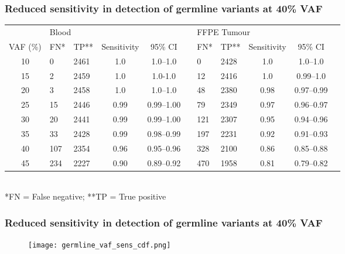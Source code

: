 \documentclass{beamer}
\begin{document}
\begin{frame}
\frametitle{Reduced sensitivity in detection of germline variants at 40\% VAF}
\begin{table}
\centering
\tiny
\begin{tabular}{cllcclllccl}
        \hline
				\multicolumn{1}{l}{ }
				&
				\multicolumn{4}{l}{Blood}
				&&
				\multicolumn{4}{l}{FFPE Tumour}
        \\
				\cline{2-5}\cline{7-10}
        VAF (\%) & FN\mbox{*} & TP\mbox{**} & Sensitivity & 95\% CI && FN\mbox{*} & TP\mbox{**} & Sensitivity & 95\% CI
        \\
        \hline
        10 & 0 & 2461 & 1.0 & 1.0--1.0 && 0 & 2428 & 1.0 & 1.0--1.0
        \\
        15 & 2 & 2459 & 1.0 & 1.0-1.0 && 12 & 2416 & 1.0 & 0.99--1.0
        \\
        20 & 3 & 2458 & 1.0 & 1.0--1.0 && 48 & 2380 & 0.98 & 0.97--0.99
        \\
        25 & 15 & 2446 & 0.99 & 0.99--1.00 && 79 & 2349 & 0.97 & 0.96--0.97
        \\
        30 & 20 & 2441 & 0.99 & 0.99--1.00 && 121 & 2307 & 0.95 & 0.94--0.96
        \\
        35 & 33 & 2428 & 0.99 & 0.98--0.99 && 197 & 2231 & 0.92 & 0.91--0.93
        \\
        40 & 107 & 2354 & 0.96 & 0.95--0.96 && 328 & 2100 & 0.86 & 0.85--0.88
        \\
        45 & 234 & 2227 & 0.90 & 0.89--0.92 && 470 & 1958 & 0.81 & 0.79--0.82
        \\
				\hline
      \end{tabular} \\
      *FN = False negative; **TP = True positive
\end{table}
\end{frame}

\begin{frame}
\frametitle{Reduced sensitivity in detection of germline variants at 40\% VAF}
\begin{figure}[t]
    \texttt{[image: germline\_vaf\_sens\_cdf.png]}
\end{figure}
\end{frame}
\end{document}
